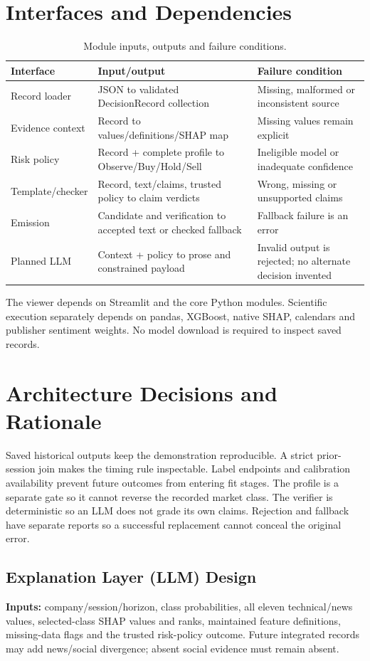 \section{Interfaces and Dependencies}
\begin{longtable}{p{}p{}p{}}
\caption{Module inputs, outputs and failure conditions.}\label{tab:interfaces}\\\toprule Interface & Input/output & Failure condition\\\midrule
Record loader & JSON to validated DecisionRecord collection & Missing, malformed or inconsistent source\\
Evidence context & Record to values/definitions/SHAP map & Missing values remain explicit\\
Risk policy & Record + complete profile to Observe/Buy/Hold/Sell & Ineligible model or inadequate confidence\\
Template/checker & Record, text/claims, trusted policy to claim verdicts & Wrong, missing or unsupported claims\\
Emission & Candidate and verification to accepted text or checked fallback & Fallback failure is an error\\
Planned LLM & Context + policy to prose and constrained payload & Invalid output is rejected; no alternate decision invented\\
\bottomrule\end{longtable}
The viewer depends on Streamlit and the core Python modules. Scientific execution separately depends on pandas, XGBoost, native SHAP, calendars and publisher sentiment weights. No model download is required to inspect saved records.
\section{Architecture Decisions and Rationale}
Saved historical outputs keep the demonstration reproducible. A strict prior-session join makes the timing rule inspectable. Label endpoints and calibration availability prevent future outcomes from entering fit stages. The profile is a separate gate so it cannot reverse the recorded market class. The verifier is deterministic so an LLM does not grade its own claims. Rejection and fallback have separate reports so a successful replacement cannot conceal the original error.
\subsection{Explanation Layer (LLM) Design}
\label{sec:llm-design}
\textbf{Inputs:} company/session/horizon, class probabilities, all eleven technical/news values, selected-class SHAP values and ranks, maintained feature definitions, missing-data flags and the trusted risk-policy outcome. Future integrated records may add news/social divergence; absent social evidence must remain absent.

